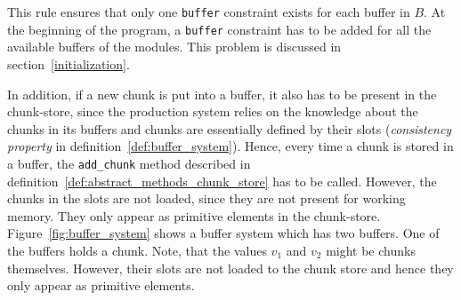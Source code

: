 This rule ensures that only one \lstinline|buffer| constraint exists for each buffer in $B$. At the beginning of the program, a \lstinline|buffer| constraint has to be added for all the available buffers of the modules. This problem is discussed in section~\ref{initialization}.

In addition, if a new chunk is put into a buffer, it also has to be present in the chunk-store, since the production system relies on the knowledge about the chunks in its buffers and chunks are essentially defined by their slots (\emph{consistency property} in definition~\ref{def:buffer_system}). Hence, every time a chunk is stored in a buffer, the \lstinline|add_chunk| method described in definition~\ref{def:abstract_methods_chunk_store} has to be called. However, the chunks in the slots are not loaded, since they are not present for working memory. They only appear as primitive elements in the chunk-store. Figure~\ref{fig:buffer_system} shows a buffer system which has two buffers. One of the buffers holds a chunk. Note, that the values $v_1$ and $v_2$ might be chunks themselves. However, their slots are not loaded to the chunk store and hence they only appear as primitive elements.

